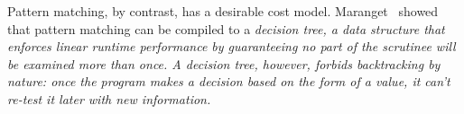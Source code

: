 \documentclass[manuscript,screen,review, 12pt, nonacm]{acmart}
\begin{document}

    Pattern matching, by contrast, has a desirable cost model.
    Maranget~\cite{maranget} showed that pattern matching can be compiled to a
    \it{decision tree}, a data structure that enforces linear runtime
    performance by guaranteeing no part of the scrutinee will be examined more
    than once. A decision tree, however, forbids backtracking by nature: once
    the program makes a decision based on the form of a value, it can't re-test
    it later with new information. 
    
\end{document}
